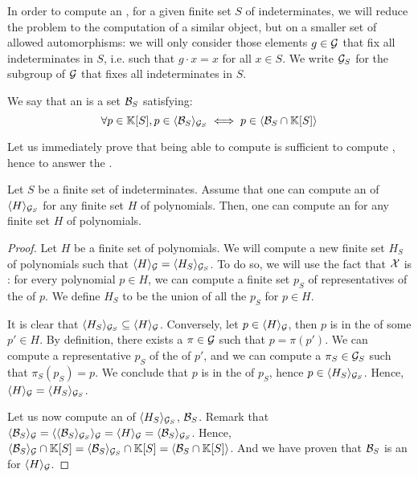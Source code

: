 In order to compute an , for a given finite set $S$
of indeterminates, we will reduce the problem to the computation of a similar
object, but on a smaller set of allowed automorphisms: we will only consider
those elements $g \in \mathcal{G}$ that fix all indeterminates in $S$, i.e. such
that $g \cdot x = x$ for all $x \in S$. We write $\mathcal{G}_S$ for the subgroup of
$\mathcal{G}$ that fixes all indeterminates in $S$.

We say that
an  is a set $\Basis_S$
satisfying:
\begin{equation*}
    \label{eq:supp-grob}
    \forall p \in \poly{\K}{S},
    p \in \gen{\Basis_S}{\group_S}
    \iff
    p \in \gen{\Basis_S \cap \poly{\K}{S}}{}
\end{equation*}

Let us immediately prove that being able to compute  is sufficient to compute , hence to
answer the .

\begin{lemma}
  \label{lem:local-to-supported}
  Let $S$ be a finite set of indeterminates.
  Assume that one can compute an 
  of $\langle H\rangle_{\mathcal{G}_S}$ for any finite set $H$ of polynomials.
  Then, 
  one can compute an 
  for any finite set $H$ 
  of polynomials.
\end{lemma}
\begin{proof}
  Let $H$ be a finite set of polynomials.
  We will compute a new finite set $H_S$ of polynomials
  such that $\langle H\rangle_{\mathcal{G}} = \langle H_S\rangle_{\mathcal{G}_S}$.
  To do so, we will use the fact that $\mathcal{X}$ is :
  for every polynomial $p \in H$, we can compute a finite set
  $p_S$ of representatives of the  of $p$.
  We define $H_S$ to be the union of all the $p_S$ for $p \in H$.

  It is clear that $\langle H_S\rangle_{\mathcal{G}_S} \subseteq \langle H\rangle_{\mathcal{G}}$.
  Conversely, let $p \in \langle H\rangle_{\mathcal{G}}$, then $p$ is in the 
  of some $p' \in H$. By definition, there exists a $\pi \in \mathcal{G}$ such that
  $p = \pi(p')$. We can compute a representative $p_S$ of the
   of $p'$, and we can compute a $\pi_S \in \mathcal{G}_S$
  such that $\pi_S(p_S) = p$. We conclude that $p$ is in the 
  of $p_S$, hence $p \in \langle H_S\rangle_{\mathcal{G}_S}$.
  Hence, $\langle H\rangle_{\mathcal{G}} = \langle H_S\rangle_{\mathcal{G}_S}$.

  Let us now compute an  of $\langle H_S\rangle_{\mathcal{G}_S}$,
  $\Basis_S$.  
  Remark that
  $\gen{\Basis_S}{\group} = \gen{\gen{\Basis_S}{\group_S}}{\group}
                           = \gen{H}{\group} 
                           = \gen{\Basis_S}{\group_S}$.
  Hence,
  $
    \gen{\Basis_S}{\group} \cap \poly{\K}{S} 
        = \gen{\Basis_S}{\group_S} \cap \poly{\K}{S}  
        = \gen{\Basis_S \cap \poly{\K}{S}}{} 
        $.
  And we have proven that $\Basis_S$ is an 
  for $\langle H\rangle_{\mathcal{G}}$.
\end{proof}


